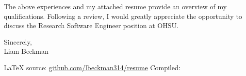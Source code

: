 \vspace*{\baselineskip}

The above experiences and my attached resume provide an overview of my qualifications. Following a review, I would greatly appreciate the opportunity to discuss the Research Software Engineer position at OHSU.

\vspace*{2\baselineskip}

Sincerely,\\

Liam Beckman

\vfill \myBreak{}
\textcolor{my-red}{\LaTeX{} source:} \textcolor{my-blue}{\href{https://github.com/lbeckman314/resume}{github.com/lbeckman314/resume}}
\hfill
\textcolor{my-red}{Compiled:} \textcolor{my-blue}{\href{https://liambeckman.com/jenkins/job/resume/}{\DTMtoday}}

